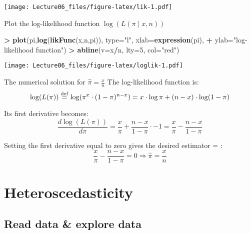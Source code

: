 \documentclass[
]{article}
\newenvironment{Shaded}{\begin{snugshade}}{\end{snugshade}}
\newcommand{\DataTypeTok}[1]{\textcolor[rgb]{0.13,0.29,0.53}{#1}}
\newcommand{\DecValTok}[1]{\textcolor[rgb]{0.00,0.00,0.81}{#1}}
\newcommand{\KeywordTok}[1]{\textcolor[rgb]{0.13,0.29,0.53}{\textbf{#1}}}
\newcommand{\NormalTok}[1]{#1}
\newcommand{\OperatorTok}[1]{\textcolor[rgb]{0.81,0.36,0.00}{\textbf{#1}}}
\newcommand{\StringTok}[1]{\textcolor[rgb]{0.31,0.60,0.02}{#1}}
\begin{document}
\texttt{[image: Lecture06\_files/figure-latex/lik-1.pdf]}

Plot the log-likelihood function \(\log(L(\pi \mid x,n))\)

\begin{Shaded}
\begin{Highlighting}[]
\OperatorTok{>}\StringTok{ }\KeywordTok{plot}\NormalTok{(pi,}\KeywordTok{log}\NormalTok{(}\KeywordTok{likFunc}\NormalTok{(x,n,pi)), }\DataTypeTok{type=}\StringTok{"l"}\NormalTok{, }\DataTypeTok{xlab=}\KeywordTok{expression}\NormalTok{(pi), }
\OperatorTok{+}\StringTok{      }\DataTypeTok{ylab=}\StringTok{"log-likelihood function"}\NormalTok{)}
\OperatorTok{>}\StringTok{ }\KeywordTok{abline}\NormalTok{(}\DataTypeTok{v=}\NormalTok{x}\OperatorTok{/}\NormalTok{n, }\DataTypeTok{lty=}\DecValTok{5}\NormalTok{, }\DataTypeTok{col=}\StringTok{"red"}\NormalTok{)}
\end{Highlighting}
\end{Shaded}

\texttt{[image: Lecture06\_files/figure-latex/loglik-1.pdf]}

The numerical solution for \(\hat{\pi} = \frac{x}{n}\) The
log-likelihood function is: \[
\log(L(\pi)) \stackrel{\rm def}{=}
    \log(\pi^x \cdot (1-\pi)^{n-x}) = x \cdot \log \pi + (n-x) \cdot \log (1-\pi)  
\]

Its first derivative becomes: \[
\frac{d \log(L(\pi))}{d \pi}  =  \frac{x}{\pi} + \frac{n-x}{1-\pi} \cdot -1 =  \frac{x}{\pi} - \frac{n-x}{1-\pi}
\]

Setting the first derivative equal to zero gives the desired estimator
\hat{\pi} = : \[
\frac{x}{\pi} - \frac{n-x}{1-\pi} = 0 \Rightarrow \hat{\pi} = \frac{x}{n}
\]

\hypertarget{heteroscedasticity}{%
\section{Heteroscedasticity}\label{heteroscedasticity}}

\hypertarget{read-data-explore-data}{%
\subsection{Read data \& explore data}\label{read-data-explore-data}}
\end{document}
